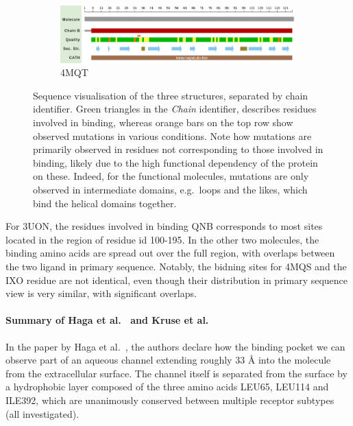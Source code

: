 \documentclass[10pt]{article}\usepackage[]{graphicx}\usepackage[]{color}
\theoremstyle{plain}
\begin{document}
\begin{multicols*}{2}
\begin{figure}[p]
    \begin{subfigure}[H]{\textwidth}
      \includegraphics[width=.9\textwidth]{../figures/4mqt_macro_nano}
      \caption{4MQT}
    \end{subfigure}%
    \caption{Sequence visualisation of the three structures, separated by chain identifier. Green triangles in the \textit{Chain} identifier, describes residues involved in binding, whereas orange bars on the top row show observed mutations in various conditions. Note how mutations are primarily observed in residues not corresponding to those involved in binding, likely due to the high functional dependency of the protein on these. Indeed, for the functional molecules, mutations are only observed in intermediate domains, e.g.\ loops and the likes, which bind the helical domains together.}
  \end{figure}
  
  For 3UON, the residues involved in binding QNB corresponds to most sites located in the region of residue id 100-195. In the other two molecules, the binding amino acids are spread out over the full region, with overlaps between the two ligand in primary sequence. Notably, the bidning sites for 4MQS and the IXO residue are not identical, even though their distribution in primary sequence view is very similar, with significant overlaps. 
\paragraph*{Summary of Haga et al.~\cite{Haga2012} and Kruse et al.~\cite{Kruse2013}\\}
  In the paper by Haga et al.~\cite{Haga2012}, the authors declare how the binding pocket we can observe part of an aqueous channel extending roughly 33 Å into the molecule from the extracellular surface. The channel itself is separated from the surface by a hydrophobic layer composed of the three amino acids LEU65, LEU114 and ILE392, which are unanimously conserved between multiple receptor subtypes (all investigated).
  

\end{multicols*}
\end{document}
